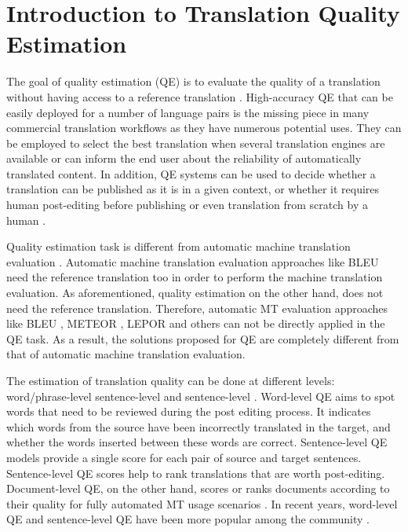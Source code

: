 \DeclareRobustCommand{\hlgreen}[1]{{\sethlcolor{lime}\hl{#1}}}

\DeclareRobustCommand{\hlred}[1]{{\sethlcolor{orange}\hl{#1}}}


\chapter{\label{cha:qe_introduction}Introduction to Translation Quality Estimation}

The goal of quality estimation (QE) is to evaluate the quality of a translation without having access to a reference translation \cite{specia-etal-2018-findings}. High-accuracy QE that can be easily deployed for a number of language pairs is the missing piece in many commercial translation workflows as they have numerous potential uses. They can be employed to select the best translation when several translation engines are available or can inform the end user about the reliability of automatically translated content. In addition, QE systems can be used to decide whether a translation can be published as it is in a given context, or whether it requires human post-editing before publishing or even translation from scratch by a human  \cite{kepler-etal-2019-openkiwi}. 

Quality estimation task is different from automatic machine translation evaluation \cite{barrault-etal-2020-findings}. Automatic machine translation evaluation approaches like BLEU \cite{papineni-etal-2002-bleu} need the reference translation too in order to perform the machine translation evaluation. As aforementioned, quality estimation on the other hand, does not need the reference translation. Therefore, automatic MT evaluation approaches like BLEU \cite{papineni-etal-2002-bleu}, METEOR \cite{banerjee-lavie-2005-meteor}, LEPOR \cite{han-etal-2012-lepor} and others can not be directly applied in the QE task. As a result, the solutions proposed for QE are completely different from that of automatic machine translation evaluation.

The estimation of translation quality can be done at different levels: word/phrase-level sentence-level and sentence-level \cite{ive-etal-2018-deepquest}. Word-level QE aims to spot words that need to be reviewed during the post editing process. It indicates which words from the source have been incorrectly translated in the target, and whether the words inserted between these words are correct. Sentence-level QE models provide a single score for each pair of source and target sentences. Sentence-level QE scores help to rank translations that are worth post-editing. Document-level QE, on the other hand, scores or ranks documents according to their quality for fully automated MT usage scenarios \cite{ive-etal-2018-deepquest}. In recent years, word-level QE and sentence-level QE have been more popular among the community \cite{specia-etal-2018-findings}.


